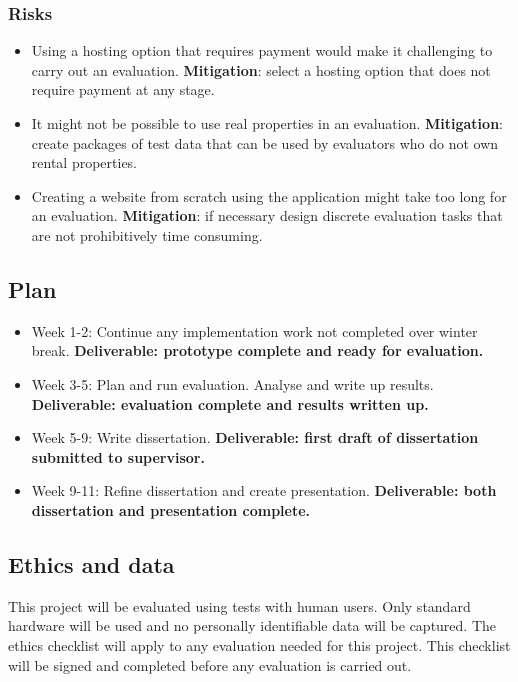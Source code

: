 \documentclass[11pt]{article}
\begin{document}
\subsubsection{Risks}\label{risks}

\begin{itemize}

\item Using a hosting option that requires payment would make it challenging to carry out an evaluation. \textbf{Mitigation}: select a hosting option that does not require payment at any stage.
\item It might not be possible to use real properties in an evaluation. \textbf{Mitigation}: create packages of test data that can be used by evaluators who do not own rental properties.
\item Creating a website from scratch using the application might take too long for an evaluation. \textbf{Mitigation}: if necessary design discrete evaluation tasks that are not prohibitively time consuming.

\end{itemize}


\subsection{Plan}\label{plan}

\begin{itemize}

\item Week 1-2: Continue any implementation work not completed over winter break. \textbf{Deliverable: prototype complete and ready for evaluation.} 
\item Week 3-5: Plan and run evaluation. Analyse and write up results. \textbf{Deliverable: evaluation complete and results written up.} 
\item Week 5-9: Write dissertation. \textbf{Deliverable: first draft of dissertation submitted to supervisor.} 
\item Week 9-11: Refine dissertation and create presentation. \textbf{Deliverable: both dissertation and presentation complete.} 

\end{itemize}


    
\subsection{Ethics and data}\label{ethics}

This project will be evaluated using tests with human users. Only standard hardware will be used and no personally identifiable data will be captured. The ethics checklist will apply to any evaluation needed for this project. This checklist will be signed and completed before any evaluation is carried out.
\end{document}
